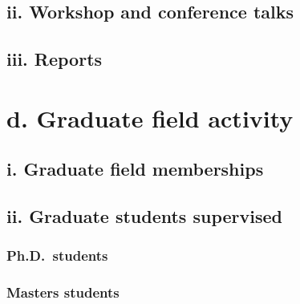 \documentclass{article}
\begin{document}


\subsection*{ii. Workshop and conference talks}



\subsection*{iii. Reports}




%
%

\section*{d. Graduate field activity}

\subsection*{i. Graduate field memberships}



\subsection*{ii. Graduate students supervised}

\subsubsection*{Ph.D.~students}



\subsubsection*{Masters students}
\end{document}
